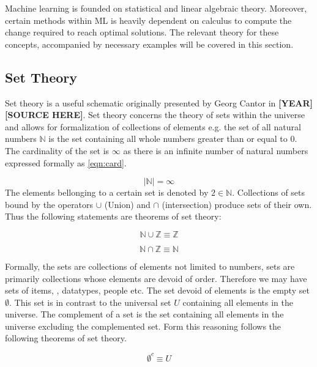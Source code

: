 
Machine learning is founded on statistical and linear algebraic theory. Moreover, certain methods within ML is heavily dependent on calculus to compute the change required to reach optimal solutions. The relevant theory for these concepts, accompanied by necessary examples will be covered in this section.

\subsection{Set Theory}

Set theory is a useful schematic originally presented by Georg Cantor in \textbf{[YEAR] [SOURCE HERE]}. Set theory concerns the theory of sets within the universe and allows for formalization of collections of elements e.g. the set of all natural numbers $\mathbb{N}$ is the set containing all whole numbers greater than or equal to 0. The cardinality of the set is $\infty$ as there is an infinite number of natural numbers expressed formally as \ref{eqn:card}.

\begin{equation}
\label{eqn:card}
|\mathbb{N}| = \infty
\end{equation}
The elements bellonging to a certain set is denoted by $2 \in \mathbb{N}$. 
Collections of sets bound by the operators $\cup$ (Union) and $\cap$ (intersection) produce sets of their own. Thus the following statements are theorems of set theory:


\begin{equation}
\label{eqn:union}
\mathbb{N} \cup \mathbb{Z} \equiv \mathbb{Z}
\end{equation}

\begin{equation}
\label{eqn:intersection}
\mathbb{N} \cap \mathbb{Z} \equiv \mathbb{N}
\end{equation}

Formally, the sets are collections of elements not limited to numbers, sets are primarily collections whose elements are devoid of order. Therefore we may have sets of items, , datatypes, people etc. The set devoid of elements is the empty set $\emptyset$. This set is in contrast to the universal set $U$ containing all elements in the universe. The complement of a set is the set containing all elements in the universe excluding the complemented set. Form this reasoning follows the following theorems of set theory.

\begin{equation}
\label{eqn:emptyC}
\emptyset^c  \equiv U
\end{equation}

